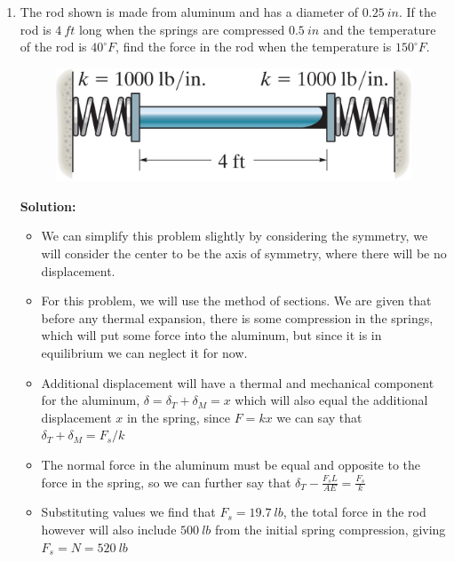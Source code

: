 \documentclass[12pt, oneside]{article}
\let\US\SI
\begin{document}
\begin{enumerate}
	\item %
		The rod shown is made from aluminum and has a diameter of $\US{0.25}{in}$.
		If the rod is $\US{4}{ft}$ long when the springs are compressed $\US{0.5}{in}$ and the temperature of the rod is $40 ^\circ F$, find the force in the rod when the temperature is $150 ^\circ F$.
		\begin{figure}[H]
			\centering
			\includegraphics[width=0.8\linewidth]{4-70}
		\end{figure}
		\textbf{Solution:}
		\begin{itemize}
			\item We can simplify this problem slightly by considering the symmetry, we will consider the center to be the axis of symmetry, where there will be no displacement.
			\item For this problem, we will use the method of sections. We are given that before any thermal expansion, there is some compression in the springs, which will put some force into the aluminum, but since it is in equilibrium we can neglect it for now.
			\item Additional displacement will have a thermal and mechanical component for the aluminum, $\delta = \delta_T + \delta_M = x$ which will also equal the additional displacement $x$ in the spring, since $F=kx$ we can say that $\delta_T + \delta_M = F_s/k$
			\item The normal force in the aluminum must be equal and opposite to the force in the spring, so we can further say that $\delta_T - \frac{F_s L}{AE} = \frac{F_s}{k} $
			\item Substituting values we find that $F_s = \US{19.7}{lb}$, the total force in the rod however will also include $\US{500}{lb}$ from the initial spring compression, giving $F_s = N = \US{520}{lb}$
		\end{itemize}


\end{enumerate}
\end{document}
